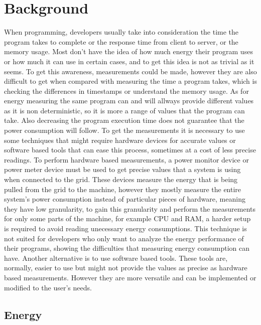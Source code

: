 \documentclass[sigplan]{acmart}
\begin{document}
\section{Background} \label{sec:background}

When programming, developers usually take into consideration the time the program takes to complete or the response time from client to server, or the memory usage. Most don't have the idea of how much energy their program uses or how much it can use in certain cases, and to get this idea is not as trivial as it seems. To get this awareness, measurements could be made, however they are also difficult to get when compared with measuring the time a program takes, which is checking the differences in timestamps or understand the memory usage. As for energy measuring the same program can and will allways provide different values as it is non deterministic, so it is more a range of values that the program can take. Also decreasing the program execution time does not guarantee that the power consumption will follow. To get the measurements it is necessary to use some techniques that might require hardware devices for accurate values or software based tools that can ease this process, sometimes at a cost of less precise readings.
To perform hardware based measurements, a power monitor device or power meter device must be used to get precise values that a system is using when connected to the grid. These devices measure the energy that is being pulled from the grid to the machine, however they mostly measure the entire system's power consumption instead of particular pieces of hardware, meaning they have low granularity, to gain this granularity and perform the measurements for only some parts of the machine, for example CPU and RAM, a harder setup is required to avoid reading unecessary energy consumptions. This technique is not suited for developers who only want to analyze the energy performance of their programs, showing the difficulties that measuring energy consumption can have.
Another alternative is to use software based tools. These tools are, normally, easier to use but might not provide the values as precise as hardware based measurements. However they are more versatile and can be implemented or modified to the user's needs. 

\subsection{Energy} \label{sec:background_energy}
\end{document}
